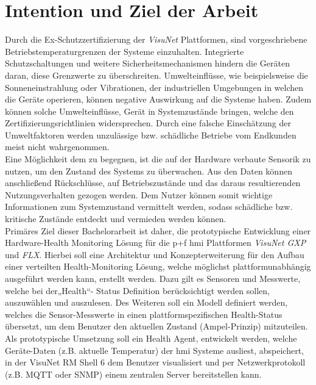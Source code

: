 \section{Intention und Ziel der Arbeit}\label{sec:IZA}
Durch die Ex-Schutzzertifizierung der \textit{VisuNet} Plattformen, sind vorgeschriebene Betriebstemperaturgrenzen der Systeme einzuhalten. Integrierte Schutzschaltungen und weitere Sicherheitsmechanismen hindern die Geräten daran, diese Grenzwerte zu überschreiten. Umwelteinflüsse, wie beispielsweise die Sonneneinstrahlung oder Vibrationen, der industriellen Umgebungen in welchen die Geräte operieren, können negative Auswirkung auf die Systeme haben. Zudem können solche Umwelteinflüsse, Gerät in Systemzustände bringen, welche den Zertifizierungsrichtlinien widersprechen. Durch eine falsche Einschätzung der Umweltfaktoren werden unzulässige bzw. schädliche Betriebe vom Endkunden meist nicht wahrgenommen.\\
Eine Möglichkeit dem zu begegnen, ist die auf der Hardware verbaute Sensorik zu nutzen, um den Zustand des Systems zu überwachen. Aus den Daten können anschließend Rückschlüsse, auf Betriebszustände und das daraus resultierenden Nutzungsverhalten gezogen werden. Dem Nutzer können somit wichtige Informationen zum Systemzustand vermittelt werden, sodass schädliche bzw. kritische Zustände entdeckt und vermieden werden können.\\
Primäres Ziel dieser Bachelorarbeit ist daher, die prototypische Entwicklung einer Hardware-Health Monitoring Lösung für die \acl{p+f} \ac{hmi} Plattformen \textit{VisuNet GXP} und \textit{FLX}. Hierbei soll eine Architektur und Konzepterweiterung für den Aufbau einer verteilten Health-Monitoring Lösung, welche möglichst plattformunabhängig ausgeführt werden kann, erstellt werden. Dazu gilt es Sensoren und Messwerte, welche bei der„Health“- Status Definition berücksichtigt werden sollen, auszuwählen und auszulesen. Des Weiteren soll ein Modell definiert werden, welches die Sensor-Messwerte in einen plattformspezifischen Health-Status übersetzt, um dem Benutzer den aktuellen Zustand (Ampel-Prinzip) mitzuteilen. Als prototypische Umsetzung soll ein Health Agent, entwickelt werden, welche Geräte-Daten (z.B. aktuelle Temperatur) der \ac{hmi} Systeme ausliest, abspeichert, in der VisuNet RM Shell 6 dem Benutzer visualisiert und per Netzwerkprotokoll (z.B. MQTT oder SNMP) einem zentralen Server bereitstellen kann.    

